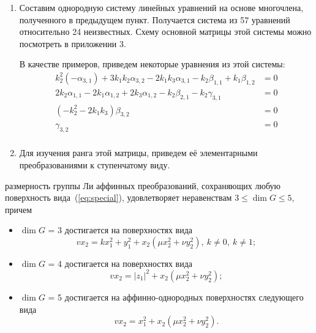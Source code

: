 \documentclass[../main.tex]{subfiles}
\begin{document}
\begin{enumerate}
\item Составим однородную систему линейных уравнений на основе многочлена, полученного в предыдущем пункт. Получается система из 57 уравнений относительно 24 неизвестных. Схему основной матрицы этой системы можно посмотреть в приложении 3. 

В качестве примеров, приведем некоторые уравнения из этой системы:
\begin{align*}
k_2^2 \left(-\alpha _{3,1}\right)+3 k_1 k_2 \alpha _{3,2}-2 k_1 k_3 \alpha _{3,1}-k_2 \beta _{1,1}+k_1 \beta _{1,2} &= 0 \\
2 k_2 \alpha _{1,1}-2 k_1 \alpha _{1,2}+2 k_3 \alpha _{1,2}-k_2 \beta _{2,1}-k_2 \gamma _{3,1} &=0 \\
\left(-k_2^2-2 k_1 k_3\right) \beta _{3,2} &=0 \\ 
\gamma_{3,2} &= 0\\ 
\end{align*}

\item Для изучения ранга этой матрицы, приведем её элементарными преобразованиями к ступенчатому виду.

\end{enumerate}



\begin{theorem} размерность группы Ли аффинных преобразований, сохраняющих любую поверхность вида~(\ref{eq:special}), удовлетворяет неравенствам
$3 \le \dim G \le 5$, причем
\begin{itemize}
	\item $\dim G$ = 3 достигается на поверхностях вида
	\begin{equation}\label{eq:special_3}
		v x_2 = k x_1^2 + y_1^2 + x_2 (\mu x_2^2 + \nu y_2^2),\ k \ne 0, \ k \ne 1;
	\end{equation}
	\item $\dim G$ = 4 достигается на поверхностях вида
	\begin{equation}\label{eq:special_4}
		v x_2 = |z_1|^2 + x_2 (\mu x_2^2 + \nu y_2^2);
	\end{equation}
		\item $\dim G$ = 5 достигается на аффинно-однородных поверхностях следующего вида
	\begin{equation}\label{eq:special_5}
		v x_2 = x_1^2 + x_2 (\mu x_2^2 + \nu y_2^2).
	\end{equation}
\end{itemize}
\end{theorem}
\end{document}
